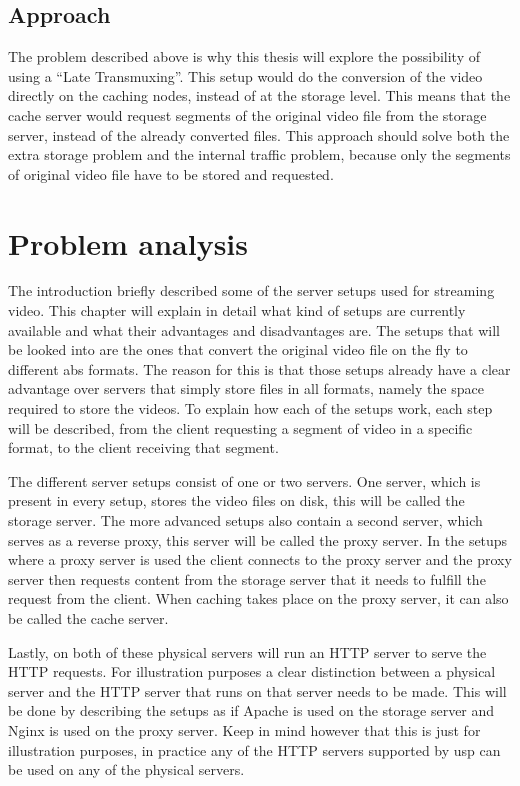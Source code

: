 \documentclass[twoside,openright]{uva-bachelor-thesis}
\begin{document}
\section{Approach}
The problem described above is why this thesis will explore the possibility of
using a ``Late Transmuxing''. This setup would do the conversion of the video
directly on the caching nodes, instead of at the storage level. This means that
the cache server would request segments of the original video file from the storage server,
instead of the already converted files. This approach should solve both the
extra storage problem and the internal traffic problem, because only the segments
of original video file have to be stored and requested.






\chapter{Problem analysis}\label{ch:problem}
The introduction briefly described some of the server setups used for streaming
video. This chapter will explain in detail what kind of setups are currently
available and what their advantages and disadvantages are. The setups that will
be looked into are the ones that convert the original video file on the fly to
different \gls{abs} formats. The reason for this is that those setups already
have a clear advantage over servers that simply store files in all formats,
namely the space required to store the videos. To explain how each of the setups
work, each step will be described, from the client requesting a segment of video
in a specific format, to the client receiving that segment.

The different server setups consist of one or two servers. One server, which is
present in every setup, stores the video files on disk, this will be called the
storage server. The more advanced setups also contain a second server, which
serves as a reverse proxy, this server will be called the proxy server. In the
setups where a proxy server is used the client connects to the proxy server and
the proxy server then requests content from the storage server that it needs to
fulfill the request from the client. When caching takes place on the proxy
server, it can also be called the cache server.

Lastly, on both of these physical servers will run an HTTP server to serve the
HTTP requests. For illustration purposes a clear distinction between a
physical server and the HTTP server that runs on that server needs to be made.
This will be done by describing the setups as if Apache is used on the storage
server and Nginx is used on the proxy server. Keep in mind however that this is
just for illustration purposes, in practice any of the HTTP servers supported by
\gls{usp} can be used on any of the physical servers.
\end{document}
